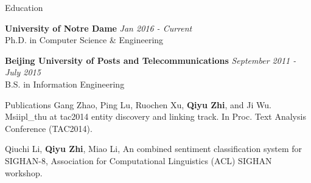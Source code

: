 \documentclass{resume} %
\begin{document}

\begin{rSection}{Education}

{\bf University of Notre Dame} \hfill {\em Jan 2016 - Current} \\ 
Ph.D. in Computer Science \& Engineering

{\bf Beijing University of Posts and Telecommunications} \hfill {\em September 2011 - July 2015} \\ 
B.S. in Information Engineering 
\end{rSection}

\begin{rSection}{Publications}
Gang Zhao, Ping Lu, Ruochen Xu, {\bf Qiyu Zhi}, and Ji Wu. Msiipl\_thu at tac2014 entity discovery and linking track. In Proc. Text Analysis Conference (TAC2014).

Qiuchi Li, {\bf Qiyu Zhi}, Miao Li, An combined sentiment classification system for SIGHAN-8, Association for Computational Linguistics (ACL) SIGHAN workshop.
\end{rSection}

\end{document}
